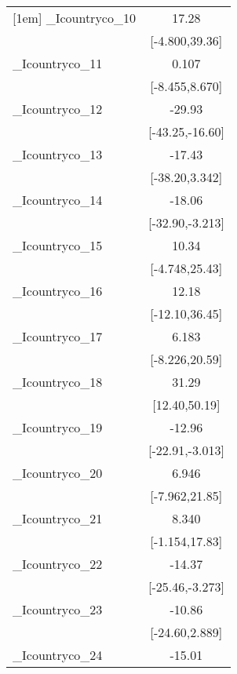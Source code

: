 {\begin{tabular}{l*{1}{c}}
[1em]
\_Icountryco\_10&                 17.28         \\
            &        [-4.800,39.36]         \\
[1em]
\_Icountryco\_11&                 0.107         \\
            &        [-8.455,8.670]         \\
[1em]
\_Icountryco\_12&                -29.93\sym{***}\\
            &       [-43.25,-16.60]         \\
[1em]
\_Icountryco\_13&                -17.43         \\
            &        [-38.20,3.342]         \\
[1em]
\_Icountryco\_14&                -18.06\sym{*}  \\
            &       [-32.90,-3.213]         \\
[1em]
\_Icountryco\_15&                 10.34         \\
            &        [-4.748,25.43]         \\
[1em]
\_Icountryco\_16&                 12.18         \\
            &        [-12.10,36.45]         \\
[1em]
\_Icountryco\_17&                 6.183         \\
            &        [-8.226,20.59]         \\
[1em]
\_Icountryco\_18&                 31.29\sym{**} \\
            &         [12.40,50.19]         \\
[1em]
\_Icountryco\_19&                -12.96\sym{*}  \\
            &       [-22.91,-3.013]         \\
[1em]
\_Icountryco\_20&                 6.946         \\
            &        [-7.962,21.85]         \\
[1em]
\_Icountryco\_21&                 8.340         \\
            &        [-1.154,17.83]         \\
[1em]
\_Icountryco\_22&                -14.37\sym{*}  \\
            &       [-25.46,-3.273]         \\
[1em]
\_Icountryco\_23&                -10.86         \\
            &        [-24.60,2.889]         \\
[1em]
\_Icountryco\_24&                -15.01\sym{*}  \\

\end{tabular}}
